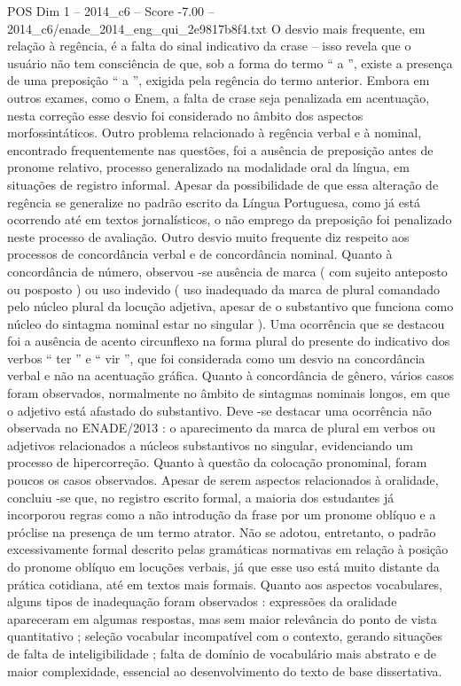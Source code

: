 \begin{textsample}{POS Dim 1 – 2014\_c6 – Score -7.00 – 2014\_c6/enade\_2014\_eng\_qui\_2e9817b8f4.txt}
O desvio mais frequente, em relação à regência, é a falta do sinal indicativo da crase – isso revela que o usuário não tem consciência de que, sob a forma do termo “ a ”, existe a presença de uma preposição “ a ”, exigida pela regência do termo anterior.
Embora em outros exames, como o Enem, a falta de crase seja penalizada em acentuação, nesta correção esse desvio foi considerado no âmbito dos aspectos morfossintáticos.
Outro problema relacionado à regência verbal e à nominal, encontrado frequentemente nas questões, foi a ausência de preposição antes de pronome relativo, processo generalizado na modalidade oral da língua, em situações de registro informal.
Apesar da possibilidade de que essa alteração de regência se generalize no padrão escrito da Língua Portuguesa, como já está ocorrendo até em textos jornalísticos, o não emprego da preposição foi penalizado neste processo de avaliação.
Outro desvio muito frequente diz respeito aos processos de concordância verbal e de concordância nominal.
Quanto à concordância de número, observou -se ausência de marca ( com sujeito anteposto ou posposto ) ou uso indevido ( uso inadequado da marca de plural comandado pelo núcleo plural da locução adjetiva, apesar de o substantivo que funciona como núcleo do sintagma nominal estar no singular ).
Uma ocorrência que se destacou foi a ausência de acento circunflexo na forma plural do presente do indicativo dos verbos “ ter ” e “ vir ”, que foi considerada como um desvio na concordância verbal e não na acentuação gráfica.
Quanto à concordância de gênero, vários casos foram observados, normalmente no âmbito de sintagmas nominais longos, em que o adjetivo está afastado do substantivo.
Deve -se destacar uma ocorrência não observada no ENADE/2013 : o aparecimento da marca de plural em verbos ou adjetivos relacionados a núcleos substantivos no singular, evidenciando um processo de hipercorreção.
Quanto à questão da colocação pronominal, foram poucos os casos observados.
Apesar de serem aspectos relacionados à oralidade, concluiu -se que, no registro escrito formal, a maioria dos estudantes já incorporou regras como a não introdução da frase por um pronome oblíquo e a próclise na presença de um termo atrator.
Não se adotou, entretanto, o padrão excessivamente formal descrito pelas gramáticas normativas em relação à posição do pronome oblíquo em locuções verbais, já que esse uso está muito distante da prática cotidiana, até em textos mais formais.
Quanto aos aspectos vocabulares, alguns tipos de inadequação foram observados : expressões da oralidade apareceram em algumas respostas, mas sem maior relevância do ponto de vista quantitativo ; seleção vocabular incompatível com o contexto, gerando situações de falta de inteligibilidade ; falta de domínio de vocabulário mais abstrato e de maior complexidade, essencial ao desenvolvimento do texto de base dissertativa.

\end{textsample}
